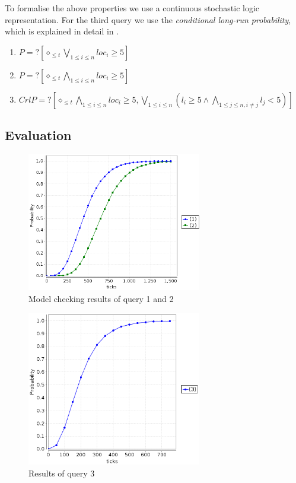 \documentclass[a4paper, 10pt]{article}
\begin{document}
To formalise the above properties we use a continuous stochastic logic\cite{assb96}\cite{bkh99} representation. For the third query we use the \emph{conditional long-run probability}, which is explained in detail in \cite{fmix}.
\begin{enumerate}
	\item $P=? [\diamond_{\le t} \bigvee_{1 \le i \le n} loc_i \ge 5]$
	\item $P=? [\diamond_{\le t} \bigwedge_{1 \le i \le n} loc_i \ge 5]$
	\item $CrlP=? [\diamond_{\le t} \bigwedge_{1 \le i \le n} loc_i \ge 5, \bigvee_{1 \le i \le n} (l_i \ge 5 \wedge \bigwedge_{1 \le j \le n, i \neq j} l_j < 5)]$
\end{enumerate}
\subsection{Evaluation}
\begin{figure}[htbp]
	\centering
	\includegraphics[width=3in]{one-and-all}
	\caption{Model checking results of query 1 and 2}
	\label{fig:one-and-all}
\end{figure}
\begin{figure}[htbp]
	\centering
	\includegraphics[width=3in]{one2all}
	\caption{Results of query 3}
	\label{fig:one2all}
\end{figure}
\end{document}
